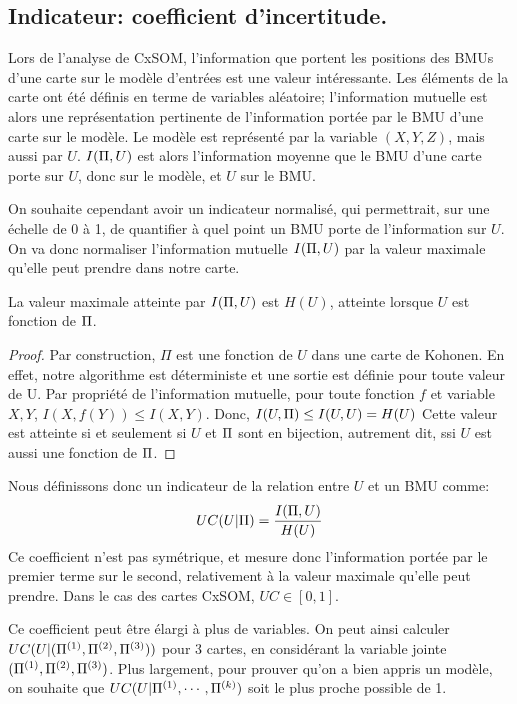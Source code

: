 \subsection{Indicateur: coefficient d'incertitude.}

Lors de l'analyse de CxSOM, l'information que portent les positions des BMUs d'une carte sur le modèle d'entrées est une valeur intéressante. Les éléments de la carte ont été définis en terme de variables aléatoire; l'information mutuelle est alors une représentation pertinente de l'information portée par le BMU d'une carte sur le modèle. Le modèle est représenté par la variable $(X,Y,Z)$, mais aussi par $U$. $I(\Pi, U)$ est alors l'information moyenne que le BMU d'une carte porte sur $U$, donc sur le modèle, et $U$ sur le BMU.

On souhaite cependant avoir un indicateur normalisé, qui permettrait, sur une échelle de 0 à 1, de quantifier à quel point un BMU porte de l'information sur $U$. On va donc normaliser l'information mutuelle $I(\Pi,U)$ par la valeur maximale qu'elle peut prendre dans notre carte.

\begin{propriete}
La valeur maximale atteinte par $I(\Pi,U)$ est $H(U)$, atteinte lorsque $U$ est fonction de $\Pi$.
\end{propriete}

\begin{proof}
Par construction, $\Pi$ est une fonction de $U$ dans une carte de Kohonen. En effet, notre algorithme est déterministe et une sortie est définie pour toute valeur de U. 
Par propriété de l'information mutuelle, pour toute fonction $f$ et variable $X,Y$, $I(X,f(Y)) \leq I(X,Y) $.
Donc, $I(U,\Pi) \leq I(U,U) = H(U)$
Cette valeur est atteinte si et seulement si $U$ et $\Pi$ sont en bijection, autrement dit, ssi $U$ est aussi une fonction de $\Pi$.
\end{proof}

Nous définissons donc un indicateur de la relation entre $U$ et un BMU comme:
\begin{equation}
UC(U|\Pi) = \frac{I(\Pi,U)}{H(U)}
\end{equation}
Ce coefficient n'est pas symétrique, et mesure donc l'information portée par le premier terme sur le second, relativement à la valeur maximale qu'elle peut prendre. Dans le cas des cartes CxSOM, $UC \in [0,1]$. 

Ce coefficient peut être élargi à plus de variables. On peut ainsi calculer $UC(U | (\Pi^{({1})},\Pi^{({2})},\Pi^{({3})}))$ pour 3 cartes, en considérant la variable jointe $(\Pi^{({1})},\Pi^{({2})},\Pi^{({3})})$. Plus largement, pour prouver qu'on a bien appris un modèle, on souhaite que $UC(U|\Pi^{({1})},\cdots,\Pi^{({k})})$ soit le plus proche possible de 1.

